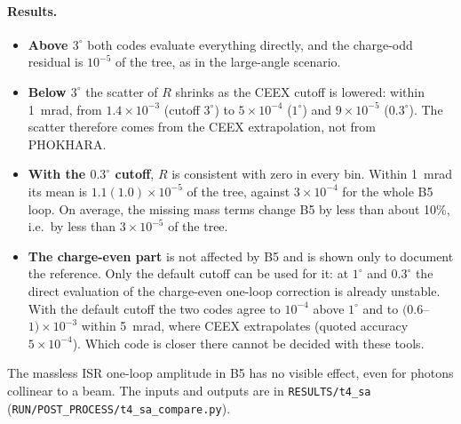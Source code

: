 \documentclass[11pt,a4paper]{article}
\newcommand{\code}[1]{\texttt{#1}}
\newcommand{\phok}{PHOKHARA}
\newcommand{\ceex}{CEEX}
\begin{document}
\paragraph{Results.}
\begin{itemize}
\item \textbf{Above $3^\circ$} both codes evaluate everything directly, and the charge-odd
  residual is $10^{-5}$ of the tree, as in the large-angle scenario.
\item \textbf{Below $3^\circ$} the scatter of $R$ shrinks as the \ceex{} cutoff is lowered: within
  1~mrad, from $1.4\times10^{-3}$ (cutoff $3^\circ$) to $5\times10^{-4}$ ($1^\circ$) and
  $9\times10^{-5}$ ($0.3^\circ$). The scatter therefore comes from the \ceex{} extrapolation, not
  from \phok.
\item \textbf{With the $0.3^\circ$ cutoff}, $R$ is consistent with zero in every bin. Within
  1~mrad its mean is $1.1(1.0)\times10^{-5}$ of the tree, against $3\times10^{-4}$ for the whole
  B5 loop. On average, the missing mass terms change B5 by less than about 10\%, i.e.\ by less than
  $3\times10^{-5}$ of the tree.
\item \textbf{The charge-even part} is not affected by B5 and is shown only to document the
  reference. Only the default cutoff can be used for it: at $1^\circ$ and $0.3^\circ$ the direct
  evaluation of the charge-even one-loop correction is already unstable. With the default
  cutoff the two codes agree to $10^{-4}$ above $1^\circ$ and to $(0.6$--$1)\times10^{-3}$
  within 5~mrad, where \ceex{} extrapolates (quoted accuracy $5\times10^{-4}$). Which code is
  closer there cannot be decided with these tools.
\end{itemize}
The massless ISR one-loop amplitude in B5 has no visible effect, even for photons collinear to a
beam. The inputs and outputs are in \code{RESULTS/t4\_sa} (\code{RUN/POST\_PROCESS/t4\_sa\_compare.py}).
\end{document}
